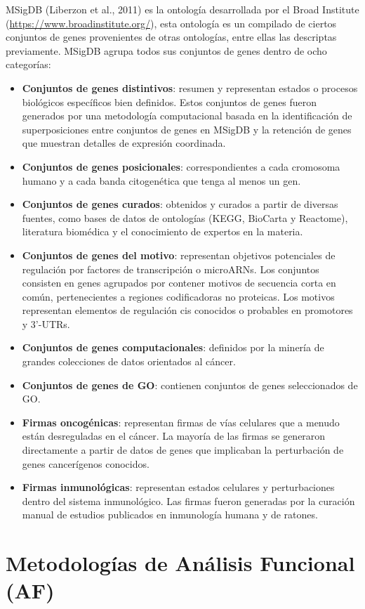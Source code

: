 \documentclass[12pt,twoside]{reedthesis}
\providecommand{\tightlist}{%
  \setlength{\itemsep}{0pt}\setlength{\parskip}{0pt}}
\begin{document}
MSigDB (Liberzon et al., 2011) es la ontología desarrollada por el Broad Institute (\url{https://www.broadinstitute.org/}), esta ontología es un compilado de ciertos conjuntos de genes provenientes de otras ontologías, entre ellas las descriptas previamente. MSigDB agrupa todos sus conjuntos de genes dentro de ocho categorías:
\begin{itemize}
\tightlist
\item
  \textbf{Conjuntos de genes distintivos}: resumen y representan estados o procesos biológicos específicos bien definidos. Estos conjuntos de genes fueron generados por una metodología computacional basada en la identificación de superposiciones entre conjuntos de genes en MSigDB y la retención de genes que muestran detalles de expresión coordinada.
\item
  \textbf{Conjuntos de genes posicionales}: correspondientes a cada cromosoma humano y a cada banda citogenética que tenga al menos un gen.
\item
  \textbf{Conjuntos de genes curados}: obtenidos y curados a partir de diversas fuentes, como bases de datos de ontologías (KEGG, BioCarta y Reactome), literatura biomédica y el conocimiento de expertos en la materia.
\item
  \textbf{Conjuntos de genes del motivo}: representan objetivos potenciales de regulación por factores de transcripción o microARNs. Los conjuntos consisten en genes agrupados por contener motivos de secuencia corta en común, pertenecientes a regiones codificadoras no proteicas. Los motivos representan elementos de regulación cis conocidos o probables en promotores y 3'-UTRs.
\item
  \textbf{Conjuntos de genes computacionales}: definidos por la minería de grandes colecciones de datos orientados al cáncer.
\item
  \textbf{Conjuntos de genes de GO}: contienen conjuntos de genes seleccionados de GO.
\item
  \textbf{Firmas oncogénicas}: representan firmas de vías celulares que a menudo están desreguladas en el cáncer. La mayoría de las firmas se generaron directamente a partir de datos de genes que implicaban la perturbación de genes cancerígenos conocidos.
\item
  \textbf{Firmas inmunológicas}: representan estados celulares y perturbaciones dentro del sistema inmunológico. Las firmas fueron generadas por la curación manual de estudios publicados en inmunología humana y de ratones.
\end{itemize}
\hypertarget{sec:af}{%
\section{Metodologías de Análisis Funcional (AF)}\label{sec:af}}
\end{document}
